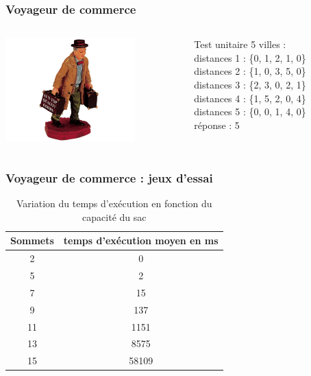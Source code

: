\documentclass[french]{beamer}
\begin{document}
\begin{frame}
  \frametitle{Voyageur de commerce}
  \begin{columns}
    \begin{column}[]{5cm}
      \begin{center}
        \includegraphics[height=4cm]{../images/salesman2.jpg}
      \end{center}
    \end{column}
      \begin{column}[]{6cm}
        \begin{block}{Test unitaire}
	5 villes : \\
	distances 1 : \{0, 1, 2, 1, 0\} \\
	distances 2 : \{1, 0, 3, 5, 0\} \\
	distances 3 : \{2, 3, 0, 2, 1\} \\
	distances 4 : \{1, 5, 2, 0, 4\} \\
	distances 5 : \{0, 0, 1, 4, 0\} \\
	réponse : 5
        \end{block}
      \end{column}
    \end{columns}
  \end{frame}

\begin{frame}
\frametitle{Voyageur de commerce : jeux d'essai}
\begin{table}[h!]
\centering
\begin{tabular}{|c|c|}
\hline
Sommets & temps d'exécution moyen en ms\\
\hline
2 & 0\\
\hline
5 & 2\\
\hline
7 & 15\\
\hline
9 & 137\\
\hline
11 & 1151\\
\hline
13 & 8575\\
\hline
15 & 58109\\
\hline
\end{tabular}
\caption {Variation du temps d'exécution en fonction du capacité du sac}
\end{table}
\end{frame}
\end{document}
